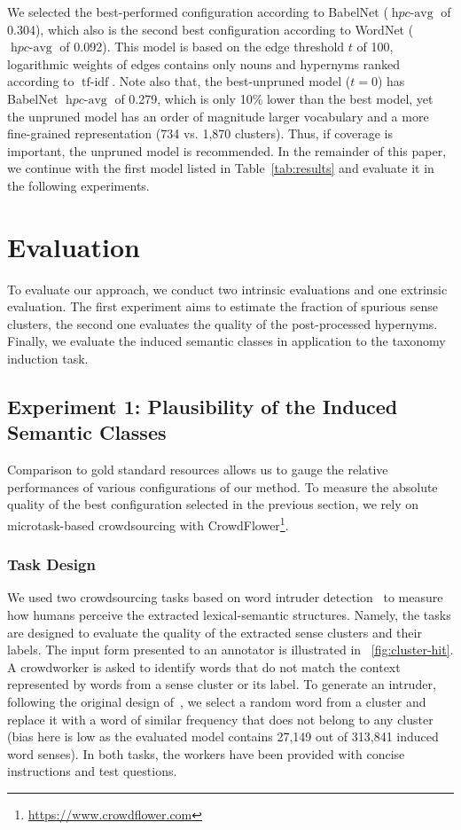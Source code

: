 \documentclass[10pt, a4paper]{article}
\DeclareMathOperator{\tfidf}{tf-idf}
\DeclareMathOperator{\hpcavg}{\mathit{hpc}-avg}
\begin{document}
We selected the best-performed configuration according to BabelNet ($\hpcavg$ of 0.304), which also is the second best configuration according to WordNet ($\hpcavg$ of 0.092). This model is based on the edge threshold $t$ of 100, logarithmic weights of edges contains only nouns and hypernyms ranked according to $\tfidf$. Note also that, the best-unpruned model ($t=0$) has  BabelNet $\hpcavg$  of 0.279, which is only 10\% lower than the best model, yet the unpruned model has an order of magnitude larger vocabulary and a more fine-grained representation (734 vs. 1,870 clusters). Thus, if coverage is important, the unpruned model is recommended. In the remainder of this paper, we continue with the first model listed in Table~\ref{tab:results} and evaluate it in the following experiments. 



\section{Evaluation}

To evaluate our approach, we conduct two intrinsic evaluations and one extrinsic evaluation. The first experiment aims to estimate the fraction of spurious sense clusters, the second one evaluates the quality of the post-processed hypernyms. Finally, we evaluate the induced semantic classes in application to the taxonomy induction task.

\subsection{Experiment 1: Plausibility of the Induced Semantic Classes}

Comparison to gold standard resources allows us to gauge the relative performances of various configurations of our method. To measure the absolute quality of the best configuration selected in the previous section, we rely on microtask-based crowdsourcing with CrowdFlower\footnote{\url{https://www.crowdflower.com}}. 

\subsubsection{Task Design}

We used two crowdsourcing tasks based on word intruder detection~\cite{Chang:09} to measure how humans perceive the extracted lexical-semantic structures. Namely, the tasks are designed to evaluate the quality of the extracted sense clusters and their labels. The input form presented to an annotator is illustrated in \figurename~\ref{fig:cluster-hit}.
A crowdworker is asked to identify words that do not match the context represented by words from a sense cluster or its label. To generate an intruder, following the original design of~, we select a random word from a cluster and replace it with a word of similar frequency that does not belong to any cluster (bias here is low as the evaluated model contains 27,149 out of  313,841 induced word senses). In both tasks, the workers have been provided with concise instructions and test questions. 
\end{document}
